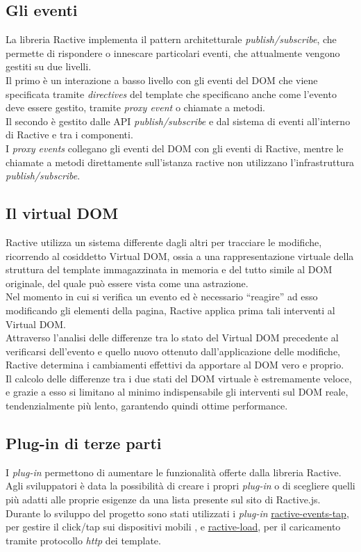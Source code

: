 \subsection{Gli eventi}
La libreria Ractive implementa il pattern architetturale  \textit{publish/subscribe}, che permette di rispondere o innescare particolari eventi, che attualmente vengono gestiti su due livelli.\\
Il primo è un interazione a basso livello con gli eventi del DOM che viene specificata tramite \textit{directives} del template che specificano anche  come l'evento deve essere gestito, tramite \textit{proxy event} o chiamate a metodi.\\
Il secondo è gestito dalle API \textit{publish/subscribe} e dal sistema di eventi all'interno di Ractive e tra i componenti.\\
I \textit{proxy events} collegano gli eventi del DOM con gli eventi di Ractive, mentre le chiamate a metodi direttamente sull'istanza ractive non utilizzano l'infrastruttura \textit{publish/subscribe}.
\subsection{Il virtual DOM}
Ractive utilizza un sistema differente dagli altri per tracciare le modifiche, ricorrendo al cosiddetto Virtual DOM, ossia a una rappresentazione virtuale della struttura del template immagazzinata in memoria e del tutto simile al DOM originale, del quale può essere vista come una astrazione.\\
Nel momento in cui si verifica un evento ed è necessario “reagire” ad esso modificando gli elementi della pagina, Ractive applica prima tali interventi al Virtual DOM.\\
Attraverso l’analisi delle differenze tra lo stato del Virtual DOM precedente al verificarsi dell’evento e quello nuovo ottenuto dall’applicazione delle modifiche, Ractive determina i cambiamenti effettivi da apportare al DOM vero e proprio.\\
Il calcolo delle differenze tra i due stati del DOM virtuale è estremamente veloce, e grazie a esso si limitano al minimo indispensabile gli interventi sul DOM reale, tendenzialmente più lento, garantendo quindi ottime performance.

\subsection{Plug-in di terze parti}\label{sec:packager}
I \textit{plug-in} permettono di aumentare le funzionalità offerte dalla libreria Ractive.\\
Agli sviluppatori è data la possibilità di creare i propri \textit{plug-in} o di scegliere quelli più adatti alle proprie esigenze da una lista presente sul sito di Ractive.js.\\
Durante lo sviluppo del progetto sono stati utilizzati i \textit{plug-in} \href{https://github.com/ractivejs/ractive-events-tap}{ractive-events-tap}, per gestire il click/tap sui dispositivi mobili , e \href{https://github.com/ractivejs/ractive-load}{ractive-load}, per il caricamento tramite protocollo \textit{http} dei template.   

